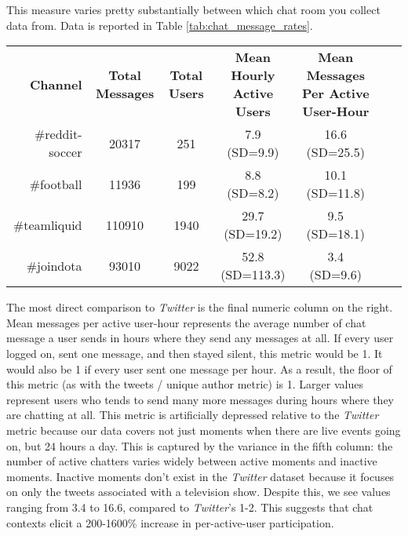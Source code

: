 This measure varies pretty substantially between which chat room you collect data from. Data is reported in Table \ref{tab:chat_message_rates}. 



\begin{table*}[tb]
\begin{tabular}{r|cccccl}
\textbf{Channel} & \textbf{Total Messages} & \textbf{Total Users} & \textbf{Mean Hourly Active Users} & \textbf{Mean  Messages Per Active User-Hour} \\

\#reddit-soccer & 20317 & 251 & 7.9 (SD=9.9) & 16.6 (SD=25.5) \\
\#football & 11936 & 199 & 8.8 (SD=8.2) & 10.1 (SD=11.8) \\
\#teamliquid & 110910 & 1940 & 29.7 (SD=19.2) & 9.5 (SD=18.1) \\
\#joindota & 93010 & 9022 & 52.8 (SD=113.3) & 3.4 (SD=9.6) \\
	
\end{tabular}
\label{tab:chat_message_rates}
\caption{Comparison of participation rates across different IRC chat rooms.}
\end{table*}

The most direct comparison to \emph{Twitter} is the final numeric column on the right. Mean messages per active user-hour represents the average number of chat message a user sends in hours where they send any messages at all. If every user logged on, sent one message, and then stayed silent, this metric would be 1. It would also be 1 if every user sent one message per hour. As a result, the floor of this metric (as with the tweets / unique author metric) is 1. Larger values represent users who tends to send many more messages during hours where they are chatting at all. This metric is artificially depressed relative to the \emph{Twitter} metric because our data covers not just moments when there are live events going on, but 24 hours a day. This is captured by the variance in the fifth column: the number of active chatters varies widely between active moments and inactive moments. Inactive moments don't exist in the \emph{Twitter} dataset because it focuses on only the tweets associated with a television show. Despite this, we see values ranging from 3.4 to 16.6, compared to \emph{Twitter}'s 1-2. This suggests that chat contexts elicit a 200-1600\% increase in per-active-user participation. 

